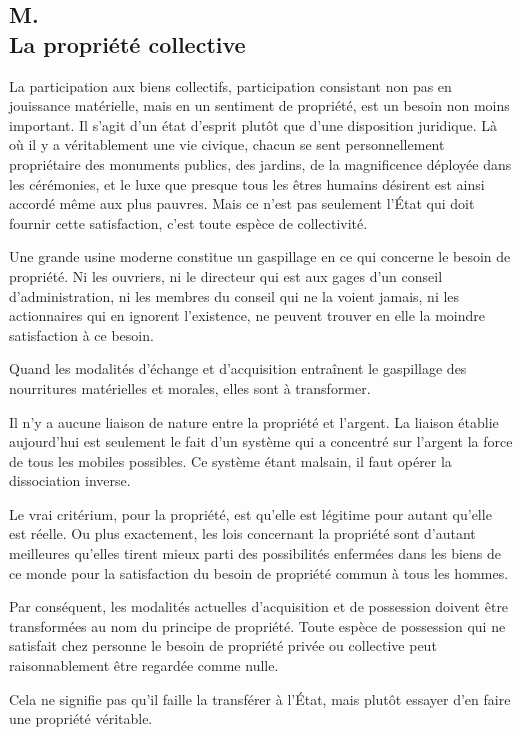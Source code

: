 \documentclass[french,twoside]{book} %
\begin{document}
\subsection[{M. La propriété collective}]{M. \\
La propriété collective}
\noindent \par
La participation aux biens collectifs, participation consistant non pas en jouissance matérielle, mais en un sentiment de propriété, est un besoin non moins important. Il s'agit d'un état d'esprit plutôt que d'une disposition juridique. Là où il y a véritablement une vie civique, chacun se sent personnellement propriétaire des monuments publics, des jardins, de la magnificence déployée dans les cérémonies, et le luxe que presque tous les êtres humains désirent est ainsi accordé même aux plus pauvres. Mais ce n'est pas seulement l'État qui doit fournir cette satisfaction, c'est toute espèce de collectivité.\par
Une grande usine moderne constitue un gaspillage en ce qui concerne le besoin de propriété. Ni les ouvriers, ni le directeur qui est aux gages d'un conseil d'administration, ni les membres du conseil qui ne la voient jamais, ni les actionnaires qui en ignorent l'existence, ne peuvent trouver en elle la moindre satisfaction à ce besoin.\par
Quand les modalités d'échange et d'acquisition entraînent le gaspillage des nourritures matérielles et morales, elles sont à transformer.\par
Il n'y a aucune liaison de nature entre la propriété et l'argent. La liaison établie aujourd'hui est seulement le fait d'un système qui a concentré sur l'argent la force de tous les mobiles possibles. Ce système étant malsain, il faut opérer la dissociation inverse.\par
Le vrai critérium, pour la propriété, est qu'elle est légitime pour autant qu'elle est réelle. Ou plus exactement, les lois concernant la propriété sont d'autant meilleures qu'elles tirent mieux parti des possibilités enfermées dans les biens de ce monde pour la satisfaction du besoin de propriété commun à tous les hommes.\par
Par conséquent, les modalités actuelles d'acquisition et de possession doivent être transformées au nom du principe de propriété. Toute espèce de possession qui ne satisfait chez personne le besoin de propriété privée ou collective peut raisonnablement être regardée comme nulle.\par
Cela ne signifie pas qu'il faille la transférer à l'État, mais plutôt essayer d'en faire une propriété véritable.
\end{document}
